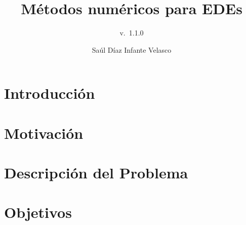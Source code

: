 \documentclass[spanish,10pt,hyperref={colorlinks=false}]{beamer}
\title[M\'etodos Steklov]%
{M\'etodos num\'ericos para EDEs}
\subtitle[v.\ 1.1.0] %
{v.\ 1.1.0}
\author[Sa\'ul D\'iaz Infante Velasco] %
{
  Sa\'ul D\'iaz Infante Velasco\\
}
\theoremstyle{plain} %
\theoremstyle{definition}
\begin{document}
%
\begin{frame}[plain] %
  \titlepage
\end{frame}
\section*{Introducci\'on}
    
\section{Motivaci\'on}
%     
%      
  \section{Descripci\'on del Problema}
%    
%    
   \section{Objetivos}
%    
%	  
%  
%    
%    
%    
%    
%    
%    
%    
%   
%   
\end{document}
